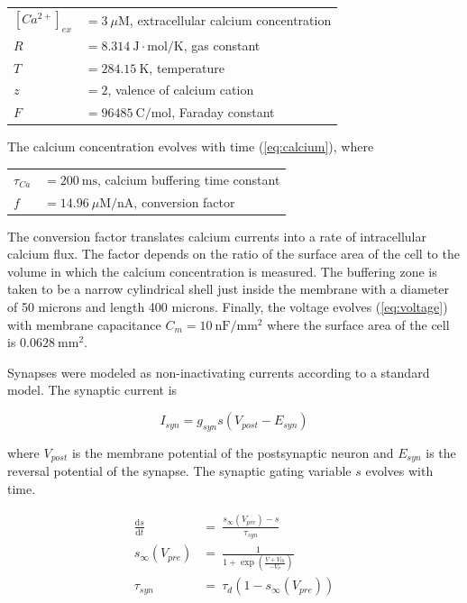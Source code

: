 \begin{tabular}{ll}
	$\left[ Ca^{2+} \right]_{ex}$ & $=3~\mu\mathrm{M}$, extracellular calcium concentration \\
	$R$   		 & $=8.314~\mathrm{J\cdot mol/K}$, gas constant \\
	$T$  	 	 & $=284.15~\mathrm{K}$, temperature \\
	$z$   		 & $=2$, valence of calcium cation \\
	$F$ 		 & $=96485~\mathrm{C/mol}$, Faraday constant
\end{tabular}

The calcium concentration evolves with time (\autoref{eq:calcium}), where

\begin{tabular}{ll}
	$\tau_{Ca}$	 & $=200~\mathrm{ms}$, calcium buffering time constant \\
	$f$  	 	 & $=14.96~\mu\mathrm{M/nA}$, conversion factor
\end{tabular}

The conversion factor translates calcium currents into a rate of intracellular calcium flux\autocite{PrinzAlternativehandtuningconductancebased2003,Liumodelneuronactivitydependent1998}. The factor depends on the ratio of the surface area of the cell to the volume in which the calcium concentration is measured. The buffering zone is taken to be a narrow cylindrical shell just inside the membrane with a diameter of 50 microns and length 400 microns. Finally, the voltage evolves (\autoref{eq:voltage}) with membrane capacitance $C_m = 10~\mathrm{nF/mm^2}$ where the surface area of the cell is $0.0628~\mathrm{mm^2}$\autocite{Hodgkinquantitativedescriptionmembrane1952,Liumodelneuronactivitydependent1998}.

Synapses were modeled as non-inactivating currents according to a standard model\autocite{AbbottModelingSmallNetworks1998}. The synaptic current is

\begin{equation}
	I_{syn} = g_{syn} s (V_{post} - E_{syn})
\end{equation}

where $V_{post}$ is the membrane potential of the postsynaptic neuron and $E_{syn}$ is the reversal potential of the synapse. The synaptic gating variable $s$ evolves with time.

\begin{align}
	\frac{\mathrm{d}s}{\mathrm{d}t} &=\ \frac{s_\infty (V_{pre}) - s}{\tau_{syn}} \\
	s_\infty (V_{pre}) &=\ \frac{1}{1 + \exp \left( \frac{V + V_{th}}{-V_\sigma} \right)} \\
	\tau_{syn} &=\  \tau_d \left( 1 - s_\infty(V_{pre}) \right)
\end{align}

